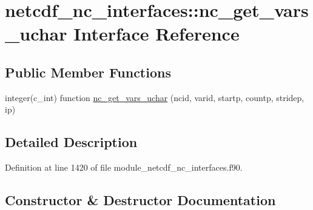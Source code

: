 \hypertarget{interfacenetcdf__nc__interfaces_1_1nc__get__vars__uchar}{}\section{netcdf\+\_\+nc\+\_\+interfaces\+:\+:nc\+\_\+get\+\_\+vars\+\_\+uchar Interface Reference}
\label{interfacenetcdf__nc__interfaces_1_1nc__get__vars__uchar}
\subsection*{Public Member Functions}
\begin{DoxyCompactItemize}
\item 
integer(c\+\_\+int) function \hyperlink{interfacenetcdf__nc__interfaces_1_1nc__get__vars__uchar_a906bcf921d929247d895f54f5a2ee9c7}{nc\+\_\+get\+\_\+vars\+\_\+uchar} (ncid, varid, startp, countp, stridep, ip)
\end{DoxyCompactItemize}


\subsection{Detailed Description}


Definition at line 1420 of file module\+\_\+netcdf\+\_\+nc\+\_\+interfaces.\+f90.



\subsection{Constructor \& Destructor Documentation}
\mbox{\label{interfacenetcdf__nc__interfaces_1_1nc__get__vars__uchar_a906bcf921d929247d895f54f5a2ee9c7}} 
